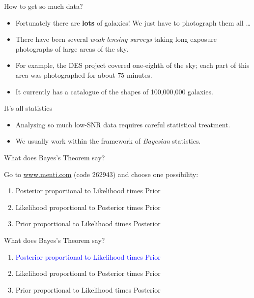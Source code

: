 \documentclass[usenames,dvipsnames]{beamer}
\newcommand{\mentiurl}[0]{{\url{www.menti.com}}}
\newcommand{\menticode}[0]{{262943}}
\newcommand{\mentiinvitation}[0]{Go to \mentiurl{} (code \menticode{}) and choose one possibility:\\}
\newcommand{\correctanswer}[1]{\textcolor{blue}{{#1} \checkmark}}
\begin{document}
\begin{frame}{How to get so much data?}
  \begin{block}{}
    \begin{itemize}
      \item{Fortunately there are \textbf{lots} of galaxies! We just have to photograph them all \ldots}
      \item{There have been several \textit{weak lensing surveys} taking long exposure photographs of large areas of the sky.}
      \item{For example, the DES project covered one-eighth of the sky; each part of this area was photographed for about 75 minutes.}
      \item{It currently has a catalogue of the shapes of 100,000,000 galaxies.}
    \end{itemize}
  \end{block}
\end{frame}

\begin{frame}{It's all statistics}
  \begin{block}{}
    \begin{itemize}
      \item{Analysing so much low-SNR data requires careful statistical treatment.}
      \item{We usually work within the framework of \textit{Bayesian} statistics.}
    \end{itemize}
  \end{block}
\end{frame}

\begin{frame}{What does Bayes's Theorem say?}
  \begin{block}{}
    \mentiinvitation{}
    \begin{enumerate}
      \item{Posterior proportional to Likelihood times Prior}
      \item{Likelihood proportional to Posterior times Prior}
      \item{Prior proportional to Likelihood times Posterior}
    \end{enumerate}
  \end{block}
\end{frame}

\begin{frame}{What does Bayes's Theorem say?}
  \begin{block}{}
    \begin{enumerate}
      \item{\correctanswer{Posterior proportional to Likelihood times Prior}}
      \item{Likelihood proportional to Posterior times Prior}
      \item{Prior proportional to Likelihood times Posterior}
    \end{enumerate}
  \end{block}
\end{frame}
 
\end{document}
